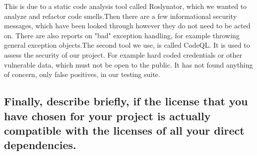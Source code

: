 This is due to a static code analysis tool called Roslynator, which we wanted to analyze and refactor code smells.Then there are a few informational security messages, which have been looked through however they do not need to be acted on. There are also reports on "bad" exception handling, for example throwing general exception objects.The second tool we use, is called CodeQL. It is used to assess the security of our project. For example hard coded credentials or other vulnerable data, which must not be open to the public. It has not found anything of concern, only false positives, in our testing suite.

\subsection{Finally, describe briefly, if the license that you have chosen for your project is actually compatible with the licenses of all your direct dependencies.}
